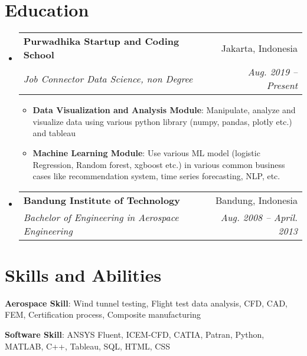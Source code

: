 \documentclass[a4paper,11pt]{article}
\makeatletter
\newcommand{\resumeItem}[2]{
  \item\small{
    \textbf{#1}{: #2 \vspace{-2pt}}
  }
}
\newcommand{\resumeSubheading}[4]{
  \vspace{-1pt}\item
    \begin{tabular*}{0.97\textwidth}[t]{l@{\extracolsep{\fill}}r}
      \textbf{#1} & #2 \\
      \textit{\small#3} & \textit{\small #4} \\
    \end{tabular*}\vspace{-3pt}
}
\newcommand{\resumeSubItem}[2]{\resumeItem{#1}{#2}\vspace{-3pt}}
\newcommand{\resumeSubHeadingListStart}{\begin{itemize}[leftmargin=*]}
\newcommand{\resumeSubHeadingListEnd}{\end{itemize}}
\newcommand{\resumeItemListStart}{\begin{itemize}}
\newcommand{\resumeItemListEnd}{\end{itemize}\vspace{-2pt}}
\makeatother
\begin{document}
%
\section{Education}
  \resumeSubHeadingListStart
    \resumeSubheading
      {Purwadhika Startup and Coding School}{Jakarta, Indonesia}
      {Job Connector Data Science, non Degree}{Aug. 2019 -- Present}
      \resumeItemListStart
        \resumeItem{Data Visualization and Analysis Module}
          {Manipulate, analyze and visualize data using various python library (numpy, pandas, plotly etc.) and tableau}
        \resumeItem{Machine Learning Module}
          {Use various ML model (logistic Regression, Random forest, xgboost etc.) in various common business cases like recommendation system, time series forecasting, NLP, etc.}
      \resumeItemListEnd

    \resumeSubheading
      {Bandung Institute of Technology}{Bandung, Indonesia}
      {Bachelor of Engineering in Aerospace Engineering}{Aug. 2008 -- April. 2013}
  \resumeSubHeadingListEnd
  
      

\section{Skills and Abilities}
 \resumeSubHeadingListStart
    \item{
     \textbf{Aerospace Skill}{: Wind tunnel testing, Flight test data analysis, CFD, CAD, FEM, Certification process, Composite manufacturing}
    \item
     \textbf{Software Skill}{: ANSYS Fluent, ICEM-CFD, CATIA, Patran, Python, MATLAB, C++, Tableau, SQL, HTML, CSS}
    }
 \resumeSubHeadingListEnd
\end{document}
